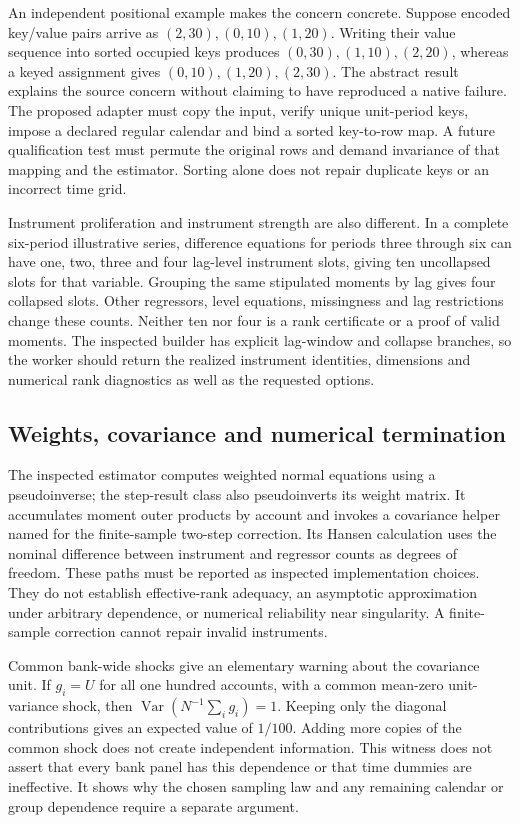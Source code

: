 An independent positional example makes the concern concrete. Suppose encoded key/value
pairs arrive as $(2,30),(0,10),(1,20)$. Writing their value sequence into sorted occupied
keys produces $(0,30),(1,10),(2,20)$, whereas a keyed assignment gives
$(0,10),(1,20),(2,30)$. The abstract result explains the source concern without claiming
to have reproduced a native failure. The proposed adapter must copy the input, verify
unique unit-period keys, impose a declared regular calendar and bind a sorted key-to-row
map. A future qualification test must permute the original rows and demand invariance
of that mapping and the estimator. Sorting alone does not repair duplicate keys or an
incorrect time grid.~\citep{exec24_pydynpd_reference}

Instrument proliferation and instrument strength are also different. In a complete
six-period illustrative series, difference equations for periods three through six
can have one, two, three and four lag-level instrument slots, giving ten uncollapsed
slots for that variable. Grouping the same stipulated moments by lag gives four
collapsed slots. Other regressors, level equations, missingness and lag restrictions
change these counts. Neither ten nor four is a rank certificate or a proof of valid
moments. The inspected builder has explicit lag-window and collapse branches, so the
worker should return the realized instrument identities, dimensions and numerical
rank diagnostics as well as the requested options.~\citep{exec24_pydynpd_source,exec24_pydynpd_reference}

\subsection{Weights, covariance and numerical termination}
The inspected estimator computes weighted normal equations using a pseudoinverse;
the step-result class also pseudoinverts its weight matrix. It accumulates moment
outer products by account and invokes a covariance helper named for the finite-sample
two-step correction. Its Hansen calculation uses the nominal difference between
instrument and regressor counts as degrees of freedom. These paths must be reported
as inspected implementation choices. They do not establish effective-rank adequacy,
an asymptotic approximation under arbitrary dependence, or numerical reliability near
singularity. A finite-sample correction cannot repair invalid instruments.
\citep{exec24_pydynpd_source,blundellbond2023}

Common bank-wide shocks give an elementary warning about the covariance unit. If
$g_i=U$ for all one hundred accounts, with a common mean-zero unit-variance shock,
then $\operatorname{Var}(N^{-1}\sum_i g_i)=1$. Keeping only the diagonal contributions
gives an expected value of $1/100$. Adding more copies of the common shock does not
create independent information. This witness does not assert that every bank panel
has this dependence or that time dummies are ineffective. It shows why the chosen
sampling law and any remaining calendar or group dependence require a separate
argument.~\citep{exec24_pydynpd_reference}

